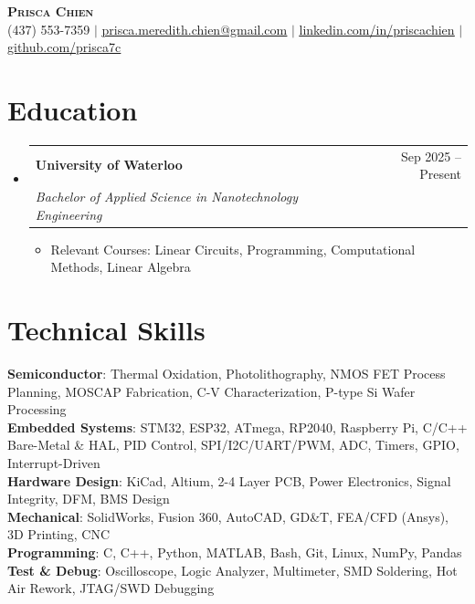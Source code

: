 \documentclass[letterpaper,11pt]{article}
\makeatletter
\newcommand{\resumeItem}[1]{
  \item\small{#1 \vspace{-2pt}}
}
\newcommand{\resumeSubheading}[3]{
  \vspace{-2pt}\item
    \begin{tabular*}{0.97\textwidth}[t]{l@{\extracolsep{\fill}}r}
      \textbf{#1} & #2 \\
      \textit{\small#3} & \\
    \end{tabular*}\vspace{-7pt}
}
\newcommand{\resumeSubHeadingListStart}{\begin{itemize}[leftmargin=0.15in, label={}]}
\newcommand{\resumeSubHeadingListEnd}{\end{itemize}}
\newcommand{\resumeItemListStart}{\begin{itemize}}
\newcommand{\resumeItemListEnd}{\end{itemize}\vspace{-5pt}}
\makeatother
\begin{document}
\begin{center}
    \textbf{\Huge \scshape Prisca Chien} \\ \vspace{1pt}
    \small
    {(437) 553-7359} $|$
    \href{mailto:prisca.meredith.chien@gmail.com}{\underline{prisca.meredith.chien@gmail.com}} $|$
    \href{https://linkedin.com/in/priscachien}{\underline{linkedin.com/in/priscachien}} $|$
    \href{https://github.com/prisca7c}{\underline{github.com/prisca7c}}
\end{center}

\section{Education}
  \resumeSubHeadingListStart
    \resumeSubheading
      {University of Waterloo}{Sep 2025 -- Present}
      {Bachelor of Applied Science in Nanotechnology Engineering}
      \resumeItemListStart
        \resumeItem{Relevant Courses: Linear Circuits, Programming, Computational Methods, Linear Algebra}
      \resumeItemListEnd
  \resumeSubHeadingListEnd

\section{Technical Skills}
 \begin{itemize}[leftmargin=0.15in, label={}]
    \small{\item{
     \textbf{Semiconductor}{: Thermal Oxidation, Photolithography, NMOS FET Process Planning, MOSCAP Fabrication, C-V Characterization, P-type Si Wafer Processing} \\
     \textbf{Embedded Systems}{: STM32, ESP32, ATmega, RP2040, Raspberry Pi, C/C++ Bare-Metal \& HAL, PID Control, SPI/I2C/UART/PWM, ADC, Timers, GPIO, Interrupt-Driven} \\
     \textbf{Hardware Design}{: KiCad, Altium, 2-4 Layer PCB, Power Electronics, Signal Integrity, DFM, BMS Design} \\
     \textbf{Mechanical}{: SolidWorks, Fusion 360, AutoCAD, GD\&T, FEA/CFD (Ansys), 3D Printing, CNC} \\
     \textbf{Programming}{: C, C++, Python, MATLAB, Bash, Git, Linux, NumPy, Pandas} \\
     \textbf{Test \& Debug}{: Oscilloscope, Logic Analyzer, Multimeter, SMD Soldering, Hot Air Rework, JTAG/SWD Debugging} \\
    }}
 \end{itemize}
\end{document}

